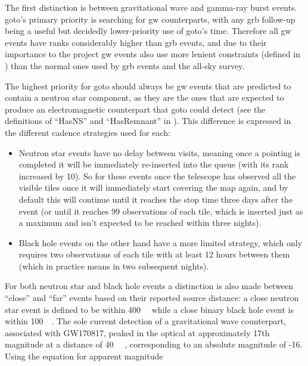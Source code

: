 \begin{colsection}
\begin{colsection}
The first distinction is between gravitational wave and gamma-ray burst events. \gls{goto}'s primary priority is searching for \gls{gw} counterparts, with any \gls{grb} follow-up being a useful but decidedly lower-priority use of \gls{goto}'s time. Therefore all \gls{gw} events have ranks considerably higher than \gls{grb} events, and due to their importance to the project \gls{gw} events also use more lenient constraints (defined in ) than the normal ones used by \gls{grb} events and the all-sky survey.

The highest priority for \gls{goto} should always be \gls{gw} events that are predicted to contain a neutron star component, as they are the ones that are expected to produce an electromagnetic counterpart that \gls{goto} could detect (see the definitions of ``HasNS'' and ``HasRemnant'' in ). This difference is expressed in the different cadence strategies used for each:

\begin{itemize}
    \item Neutron star events have no delay between visits, meaning once a pointing is completed it will be immediately re-inserted into the queue (with its rank increased by 10). So for these events once the telescope has observed all the visible tiles once it will immediately start covering the map again, and by default this will continue until it reaches the stop time three days after the event (or until it reaches 99 observations of each tile, which is inserted just as a maximum and isn't expected to be reached within three nights).
    \item Black hole events on the other hand have a more limited  strategy, which only requires two observations of each tile with at least 12 hours between them (which in practice means in two subsequent nights).
\end{itemize}

For both neutron star and black hole events a distinction is also made between ``close'' and ``far'' events based on their reported source distance: a close neutron star event is defined to be within \SI{400}{\mega\parsec} while a close binary black hole event is within \SI{100}{\mega\parsec}. The sole current detection of a gravitational wave counterpart, associated with GW170817, peaked in the optical at approximately 17th magnitude at a distance of \SI{40}{\mega\parsec} \citep{GW170817_followup}, corresponding to an absolute magnitude of -16. Using the equation for apparent magnitude


\end{colsection}
\end{colsection}
